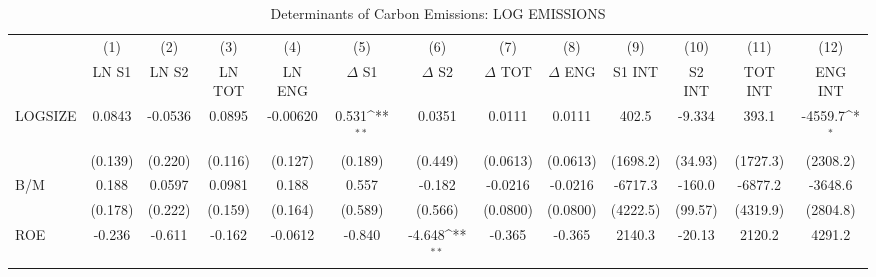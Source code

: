 \begin{table}[htbp]\centering
\def\sym#1{\ifmmode^{#1}\else\(^{#1}\)\fi}
\caption{Determinants of Carbon Emissions: LOG EMISSIONS}
\begin{tabular}{l*{12}{c}}
\hline\hline
                    &\multicolumn{1}{c}{(1)}&\multicolumn{1}{c}{(2)}&\multicolumn{1}{c}{(3)}&\multicolumn{1}{c}{(4)}&\multicolumn{1}{c}{(5)}&\multicolumn{1}{c}{(6)}&\multicolumn{1}{c}{(7)}&\multicolumn{1}{c}{(8)}&\multicolumn{1}{c}{(9)}&\multicolumn{1}{c}{(10)}&\multicolumn{1}{c}{(11)}&\multicolumn{1}{c}{(12)}\\
                    &\multicolumn{1}{c}{LN S1}&\multicolumn{1}{c}{LN S2}&\multicolumn{1}{c}{LN TOT}&\multicolumn{1}{c}{LN ENG}&\multicolumn{1}{c}{$\Delta$ S1}&\multicolumn{1}{c}{$\Delta$ S2}&\multicolumn{1}{c}{$\Delta$ TOT}&\multicolumn{1}{c}{$\Delta$ ENG}&\multicolumn{1}{c}{S1 INT}&\multicolumn{1}{c}{S2 INT}&\multicolumn{1}{c}{TOT INT}&\multicolumn{1}{c}{ENG INT}\\
\hline
LOGSIZE             &      0.0843         &     -0.0536         &      0.0895         &    -0.00620         &       0.531\sym{**} &      0.0351         &      0.0111         &      0.0111         &       402.5         &      -9.334         &       393.1         &     -4559.7\sym{*}  \\
                    &     (0.139)         &     (0.220)         &     (0.116)         &     (0.127)         &     (0.189)         &     (0.449)         &    (0.0613)         &    (0.0613)         &    (1698.2)         &     (34.93)         &    (1727.3)         &    (2308.2)         \\
B/M                 &       0.188         &      0.0597         &      0.0981         &       0.188         &       0.557         &      -0.182         &     -0.0216         &     -0.0216         &     -6717.3         &      -160.0         &     -6877.2         &     -3648.6         \\
                    &     (0.178)         &     (0.222)         &     (0.159)         &     (0.164)         &     (0.589)         &     (0.566)         &    (0.0800)         &    (0.0800)         &    (4222.5)         &     (99.57)         &    (4319.9)         &    (2804.8)         \\
ROE                 &      -0.236         &      -0.611         &      -0.162         &     -0.0612         &      -0.840         &      -4.648\sym{**} &      -0.365         &      -0.365         &      2140.3         &      -20.13         &      2120.2         &      4291.2         \\

\end{tabular}
\end{table}
